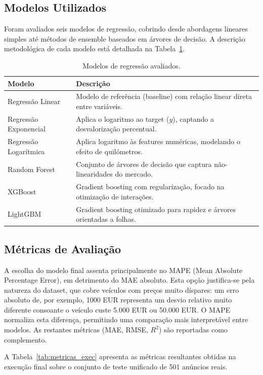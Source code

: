 \documentclass[11pt,a4paper]{article}
\begin{document}
\subsection{Modelos Utilizados}
Foram avaliados seis modelos de regressão, cobrindo desde abordagens lineares simples até métodos de ensemble baseados em árvores de decisão. A descrição metodológica de cada modelo está detalhada na Tabela~\ref{tab:modelos_desc}.

\begin{table}[H]
\centering
\caption{Modelos de regressão avaliados.}
\label{tab:modelos_desc}
\begin{tabular}{ll}
\toprule
\textbf{Modelo} & \textbf{Descrição} \\
\midrule
Regressão Linear & Modelo de referência (baseline) com relação linear direta entre variáveis. \\
Regressão Exponencial & Aplica o logaritmo ao target ($y$), captando a desvalorização percentual. \\
Regressão Logarítmica & Aplica logaritmo às features numéricas, modelando o efeito de quilómetros. \\
Random Forest & Conjunto de árvores de decisão que captura não-linearidades do mercado. \\
XGBoost & Gradient boosting com regularização, focado na otimização de interações. \\
LightGBM & Gradient boosting otimizado para rapidez e árvores orientadas a folhas. \\
\bottomrule
\end{tabular}
\end{table}

\subsection{Métricas de Avaliação}
A escolha do modelo final assenta principalmente no MAPE (Mean Absolute Percentage Error), em detrimento do MAE absoluto. Esta opção justifica-se pela natureza do dataset, que cobre veículos com preços muito díspares: um erro absoluto de, por exemplo, 1000 EUR  representa um desvio relativo muito diferente consoante o veículo custe 5.000 EUR  ou 50.000 EUR. O MAPE normaliza esta diferença, permitindo uma comparação mais interpretável entre modelos. As restantes métricas (MAE, RMSE, $R^2$) são reportadas como complemento.

A Tabela~\ref{tab:metricas_exec} apresenta as métricas resultantes obtidas na execução final sobre o conjunto de teste unificado de 501 anúncios reais.
\end{document}
